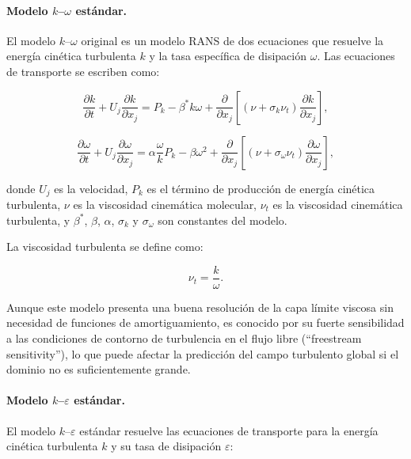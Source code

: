 \paragraph{Modelo $k$--$\omega$ estándar.}

El modelo $k$--$\omega$ original \citep{Wilcox1988} es un modelo RANS de dos 
ecuaciones que resuelve la energía cinética turbulenta $k$ y la tasa 
específica de disipación $\omega$. Las ecuaciones de transporte se escriben 
como:

\begin{equation}
\frac{\partial k}{\partial t} + U_j \frac{\partial k}{\partial x_j}
=
P_k - \beta^* k \omega
+ \frac{\partial}{\partial x_j}
\left[
(\nu + \sigma_k \nu_t)\frac{\partial k}{\partial x_j}
\right],
\end{equation}

\begin{equation}
\frac{\partial \omega}{\partial t} + U_j \frac{\partial \omega}{\partial x_j}
=
\alpha \frac{\omega}{k} P_k - \beta \omega^2
+ \frac{\partial}{\partial x_j}
\left[
(\nu + \sigma_\omega \nu_t)\frac{\partial \omega}{\partial x_j}
\right],
\end{equation}

donde $U_j$ es la velocidad, $P_k$ es el término de producción de energía 
cinética turbulenta, $\nu$ es la viscosidad cinemática molecular, $\nu_t$ es la viscosidad cinemática turbulenta, y $\beta^*$, $\beta$, $\alpha$, 
$\sigma_k$ y $\sigma_\omega$ son constantes del modelo.

La viscosidad turbulenta se define como:

\begin{equation}
\nu_t = \frac{k}{\omega}.
\end{equation}

Aunque este modelo presenta una buena resolución de la capa límite viscosa 
sin necesidad de funciones de amortiguamiento, es conocido por su fuerte 
sensibilidad a las condiciones de contorno de turbulencia en el flujo libre 
(``freestream sensitivity''), lo que puede afectar la predicción del 
campo turbulento global si el dominio no es suficientemente grande.

\paragraph{Modelo $k$--$\varepsilon$ estándar.}

El modelo $k$--$\varepsilon$ estándar \citep{Launder1974} resuelve las 
ecuaciones de transporte para la energía cinética turbulenta $k$ y su tasa 
de disipación $\varepsilon$:

